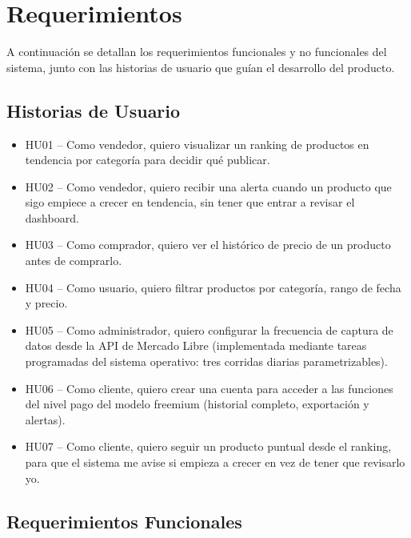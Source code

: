 \chapter{Requerimientos}\label{chapter03}

A continuación se detallan los requerimientos funcionales y no funcionales del sistema, junto con las historias de usuario que guían el desarrollo del producto.

\section{Historias de Usuario}

\begin{itemize}
	\item HU01 -- Como vendedor, quiero visualizar un ranking de productos en tendencia por categoría para decidir qué publicar.
	\item HU02 -- Como vendedor, quiero recibir una alerta cuando un producto que sigo empiece a crecer en tendencia, sin tener que entrar a revisar el dashboard.
	\item HU03 -- Como comprador, quiero ver el histórico de precio de un producto antes de comprarlo.
	\item HU04 -- Como usuario, quiero filtrar productos por categoría, rango de fecha y precio.
	\item HU05 -- Como administrador, quiero configurar la frecuencia de captura de datos desde la API de Mercado Libre (implementada mediante tareas programadas del sistema operativo: tres corridas diarias parametrizables).
	\item HU06 -- Como cliente, quiero crear una cuenta para acceder a las funciones del nivel pago del modelo freemium (historial completo, exportación y alertas).
	\item HU07 -- Como cliente, quiero seguir un producto puntual desde el ranking, para que el sistema me avise si empieza a crecer en vez de tener que revisarlo yo.
\end{itemize}

\section{Requerimientos Funcionales}

